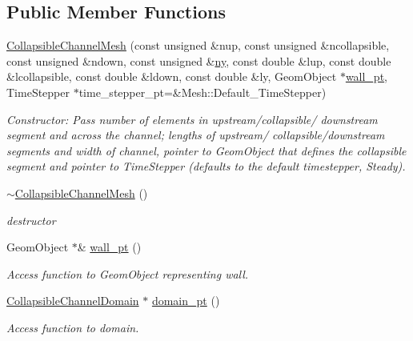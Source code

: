 \subsection*{Public Member Functions}
\begin{DoxyCompactItemize}
\item 
\hyperlink{classoomph_1_1CollapsibleChannelMesh_a4e0b14ef4b4531f043b588150ca3c0f1}{Collapsible\+Channel\+Mesh} (const unsigned \&nup, const unsigned \&ncollapsible, const unsigned \&ndown, const unsigned \&\hyperlink{classoomph_1_1SimpleRectangularQuadMesh_a45011f22dedd480392b1f376e4269921}{ny}, const double \&lup, const double \&lcollapsible, const double \&ldown, const double \&ly, Geom\+Object $\ast$\hyperlink{classoomph_1_1CollapsibleChannelMesh_a04ffeb61678763dfd250962ea9ba614b}{wall\+\_\+pt}, Time\+Stepper $\ast$time\+\_\+stepper\+\_\+pt=\&Mesh\+::\+Default\+\_\+\+Time\+Stepper)
\begin{DoxyCompactList}\small\item\em Constructor\+: Pass number of elements in upstream/collapsible/ downstream segment and across the channel; lengths of upstream/ collapsible/downstream segments and width of channel, pointer to Geom\+Object that defines the collapsible segment and pointer to Time\+Stepper (defaults to the default timestepper, Steady). \end{DoxyCompactList}\item 
\hyperlink{classoomph_1_1CollapsibleChannelMesh_a1c9b2ab27f1fb2f764ae2dc6f9f7a429}{$\sim$\+Collapsible\+Channel\+Mesh} ()
\begin{DoxyCompactList}\small\item\em destructor \end{DoxyCompactList}\item 
Geom\+Object $\ast$\& \hyperlink{classoomph_1_1CollapsibleChannelMesh_a04ffeb61678763dfd250962ea9ba614b}{wall\+\_\+pt} ()
\begin{DoxyCompactList}\small\item\em Access function to Geom\+Object representing wall. \end{DoxyCompactList}\item 
\hyperlink{classoomph_1_1CollapsibleChannelDomain}{Collapsible\+Channel\+Domain} $\ast$ \hyperlink{classoomph_1_1CollapsibleChannelMesh_a379365813e6c3566639dc55a971f0b10}{domain\+\_\+pt} ()
\begin{DoxyCompactList}\small\item\em Access function to domain. \end{DoxyCompactList}\item 

\end{DoxyCompactItemize}
